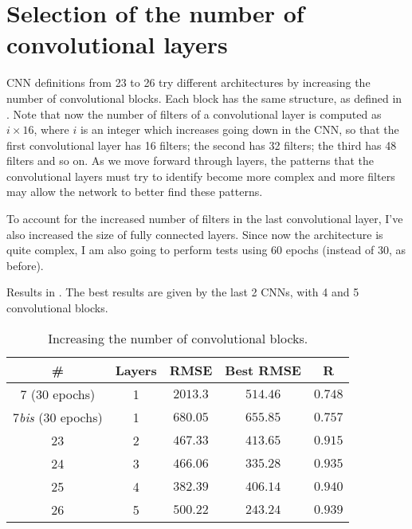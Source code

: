 \section{Selection of the number of convolutional
layers}\label{sec:cnnconvlayers}

CNN definitions from 23 to 26 try different architectures by increasing the
number of convolutional blocks. Each block has the same structure, as defined
in . Note that now the number of filters of a
convolutional layer is computed as \(i\times16\), where \(i\) is an integer
which increases going down in the CNN, so that the first convolutional layer
has 16 filters; the second has 32 filters; the third has 48 filters and so on.
As we move forward through layers, the patterns that the convolutional layers
must try to identify become more complex and more filters may allow the network
to better find these patterns.

To account for the increased number of filters in the last convolutional layer,
I've also increased the size of fully connected layers. Since now the
architecture is quite complex, I am also going to perform tests using 60 epochs
(instead of 30, as before).

Results in . The best results are given by the
last 2 CNNs, with 4 and 5 convolutional blocks.

\begin{table}[hbtp]
	\centering
	\begin{tabular}{|c|c|c|c|c|}
		\toprule
		\# & Layers & RMSE & Best RMSE & R \\
		\midrule
		7 (30 epochs) & 1 & \(2013.3\) & \(514.46\) & \(0.748\) \\
		7\emph{bis} (30 epochs) & 1 & \(680.05\) & \(655.85\) & \(0.757\) \\
		23 & 2 & \(467.33\) & \(413.65\) & \(0.915\) \\
		24 & 3 & \(466.06\) & \(335.28\) & \(0.935\) \\
		25 & 4 & \(382.39\) & \(406.14\) & \(0.940\) \\
		26 & 5 & \(500.22\) & \(243.24\) & \(0.939\) \\
		\bottomrule
	\end{tabular}
	\caption{Increasing the number of convolutional
	blocks.}\label{table:cnnconvlayers}
\end{table}
